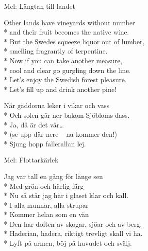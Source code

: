 \begin{SongText}
\begin{SongInfo}
    Mel: Längtan till landet
\end{SongInfo}
\begin{SongVerse}
    Other lands have vineyards without number\\*%
    and their fruit becomes the native wine.\\*%
    But the Swedes squeeze liquor out of lumber,\\*%
    smelling fragrantly of terpentine.\\*%
    Now if you can take another measure,\\*%
    cool and clear go gurgling down the line.\\*%
    Let's enjoy the Swedish forest pleasure.\\*%
    Let's fill up and drink another pine!
\end{SongVerse}
\end{SongText}
\begin{SongText}
\begin{SongVerse}
    När gäddorna leker i vikar och vass\\*%
    Och solen går ner bakom Sjöbloms dass.\\*%
    Ja, då är det vår…\\*%
    (se upp där nere – nu kommer den!)\\*%
    Sjung hopp fallerallan lej.
\end{SongVerse}
\end{SongText}
\begin{SongText}
\begin{SongInfo}
    Mel: Flottarkärlek
\end{SongInfo}
\begin{SongVerse}
    Jag var tall en gång för länge sen\\*%
    Med grön och härlig färg\\*%
    Nu så står jag här i glaset klar och kall.\\*%
    I alla munnar, alla strupar\\*%
    Kommer helan som en vän\\*%
    Den har doften av skogar, sjöar och av berg.\\*%
    Haderian, hadera, riktigt trevligt skall vi ha.\\*%
    Lyft på armen, böj på huvudet och svälj.
\end{SongVerse}
\end{SongText}

